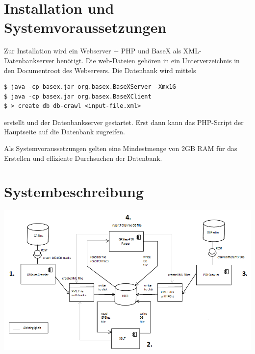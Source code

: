 \documentclass[10pt,a4paper]{scrartcl}
\begin{document}






\section{Installation und Systemvoraussetzungen}

Zur Installation wird ein Webserver + PHP und BaseX als XML-Datenbankserver benötigt. Die web-Dateien gehören in ein Unterverzeichnis in den Documentroot des Webservers. Die Datenbank wird mittels
\begin{verbatim}
$ java -cp basex.jar org.basex.BaseXServer -Xmx1G
$ java -cp basex.jar org.basex.BaseXClient
$ > create db db-crawl <input-file.xml>
\end{verbatim}

erstellt und der Datenbankserver gestartet. Erst dann kann das PHP-Script der Hauptseite auf die Datenbank zugreifen.

Als Systemvoraussetzungen gelten eine Mindestmenge von 2GB RAM für das Erstellen und effiziente Durchsuchen der Datenbank.

\section{Systembeschreibung}

\includegraphics[width=\textwidth]{run_once_schema.png}
\end{document}

